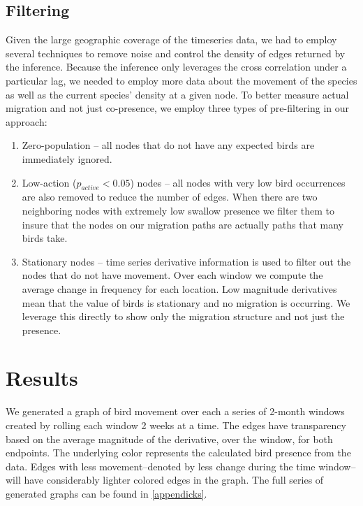 \subsection{Filtering}
Given the large geographic coverage of the timeseries data, we had to employ several techniques to remove noise and control the density of edges returned by the inference.
Because the inference only leverages the cross correlation under a particular lag, we needed to employ more data about the movement of the species as well as the current species' density at a given node.
To better measure actual migration and not just co-presence, we employ three types of pre-filtering in our approach:
\begin{enumerate}
\item Zero-population -- all nodes that do not have any expected birds are immediately ignored.
\item Low-action ($p_{active} < 0.05$) nodes -- all nodes with very low bird occurrences are also removed to reduce the number of edges.  When there are two neighboring nodes with extremely low swallow presence we filter them to insure that the nodes on our migration paths are actually paths that many birds take. 
\item Stationary nodes -- time series derivative information is used to filter out the nodes that do not have movement.  Over each window we compute the average change in frequency for each location.  Low magnitude derivatives mean that the value of birds is stationary and no migration is occurring.  We leverage this directly to show only the migration structure and not just the presence.
\end{enumerate}


\section{Results}
We generated a graph of bird movement over each a series of 2-month windows created by rolling each window 2 weeks at a time.
The edges have transparency based on the average magnitude of the derivative, over the window, for both endpoints.
The underlying color represents the calculated bird presence from the data.
Edges with less movement--denoted by less change during the time window--will have considerably lighter colored edges in the graph.
The full series of generated graphs can be found in \ref{appendicks}.



